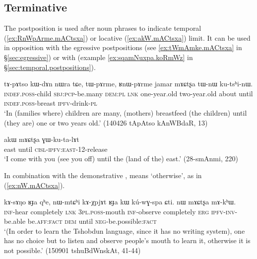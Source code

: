 \subsection{Terminative} \label{sec:terminative}  
The postposition  is used after noun phrases to indicate temporal (\ref{ex:RnWpArme.mACtsxa}) or locative (\ref{ex:akW.mACtsxa}) limit. It can be used in opposition with the egressive postpositions (see \ref{ex:tWmAmke.mACtsxa} in §\ref{sec:egressive}) or with  (example \ref{ex:sqamNuxpa.koRmWz} in §\ref{sec:temporal.postpositions}).

\begin{exe}
\ex \label{ex:RnWpArme.mACtsxa}
 \gll tɤ-pɤtso kɯ-dɤn nɯra tɕe, tɯ-pɤrme, ʁnɯ-pɤrme jamar mɤɕtʂa tɯ-nɯ ku-tsʰi-nɯ. \\
 \textsc{indef}.\textsc{poss}-child \textsc{sbj}:\textsc{pcp}-be.many \textsc{dem}:\textsc{pl} \textsc{lnk} one-year.old two-year.old about until \textsc{indef}.\textsc{poss}-breast \textsc{ipfv}-drink-\textsc{pl} \\
 \glt `In (families where) children are many, (mothers) breastfeed (the children) until (they are) one or two years old.' (140426 tApAtso kAnWBdaR, 13)
\end{exe}

\begin{exe}
\ex \label{ex:akW.mACtsxa}
 \gll akɯ mɤɕtʂa ɣɯ-ku-ta-lɤt \\ 
east until \textsc{cisl}-\textsc{ipfv}:\textsc{east}-1\fl{}2-release \\
\glt  `I come with you (see you off) until the (land of the) east.' (28-smAnmi, 220)
\end{exe}

In combination with the demonstrative ,  means `otherwise', as in (\ref{ex:nW.mACtsxa}).

\begin{exe}
\ex \label{ex:nW.mACtsxa}
 \gll   kɤ-sɤŋo ʁɟa qʰe,  nɯ-mtɕʰi kɤ-χpjɤt ʁɟa kɯ kú-wɣ-spa ɕti.  nɯ mɤɕtʂa mɤ-kʰɯ. \\
 \textsc{inf}-hear completely \textsc{lnk} \textsc{3pl}.\textsc{poss}-mouth \textsc{inf}-observe completely \textsc{erg} \textsc{ipfv}-\textsc{inv}-be.able be.\textsc{aff}:\textsc{fact} \textsc{dem} until \textsc{neg}-be.possible:\textsc{fact} \\
\glt `(In order to learn the Tshobdun language, since it has no writing system), one has no choice but to listen and observe people's mouth to learn it, otherwise it is not possible.' (150901 tshuBdWnskAt, 41-44)
\end{exe}

